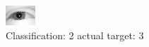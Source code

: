 \begin{figure}[h!]
\begin{center}
\includegraphics[width=0.60\columnwidth]{figures/ID2391_class_2_target_3.png}
\end{center}
\caption{ Classification: 2 actual target: 3}
\label{fig:ID2391_class_2_target_3}
\end{figure}
